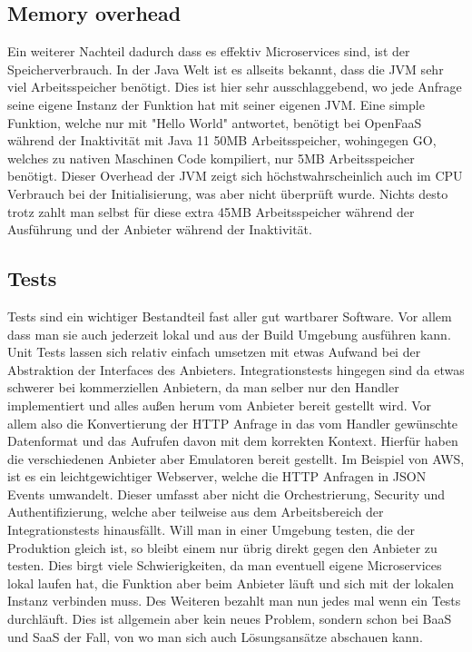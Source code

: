 \documentclass[12pt, a4paper]{article}
\begin{document}
\subsection{Memory overhead}
Ein weiterer Nachteil dadurch dass es effektiv Microservices sind, ist der Speicherverbrauch.
In der Java Welt ist es allseits bekannt, dass die \ac{JVM} sehr viel Arbeitsspeicher benötigt.
Dies ist hier sehr ausschlaggebend, wo jede Anfrage seine eigene Instanz der Funktion hat mit seiner eigenen \ac{JVM}.
Eine simple Funktion, welche nur mit "Hello World" antwortet, benötigt bei OpenFaaS während der Inaktivität mit Java 11 50MB Arbeitsspeicher, wohingegen GO, welches zu nativen Maschinen Code kompiliert, nur 5MB Arbeitsspeicher benötigt.
\newline
Dieser Overhead der JVM zeigt sich höchstwahrscheinlich auch im CPU Verbrauch bei der Initialisierung, was aber nicht überprüft wurde.
Nichts desto trotz zahlt man selbst für diese extra 45MB Arbeitsspeicher während der Ausführung und der Anbieter während der Inaktivität.

\subsection{Tests}
Tests sind ein wichtiger Bestandteil fast aller gut wartbarer Software.
Vor allem dass man sie auch jederzeit lokal und aus der Build Umgebung ausführen kann.
Unit Tests lassen sich relativ einfach umsetzen mit etwas Aufwand bei der Abstraktion der Interfaces des Anbieters.
\newline
Integrationstests hingegen sind da etwas schwerer bei kommerziellen Anbietern, da man selber nur den Handler implementiert und alles außen herum vom Anbieter bereit gestellt wird.
Vor allem also die Konvertierung der HTTP Anfrage in das vom Handler gewünschte Datenformat und das Aufrufen davon mit dem korrekten Kontext.
Hierfür haben die verschiedenen Anbieter aber Emulatoren bereit gestellt.
Im Beispiel von AWS, ist es ein leichtgewichtiger Webserver, welche die HTTP Anfragen in JSON Events umwandelt\cite{aws_lambda_rie}.
Dieser umfasst aber nicht die Orchestrierung, Security und Authentifizierung, welche aber teilweise aus dem Arbeitsbereich der Integrationstests hinausfällt.
\newline
Will man in einer Umgebung testen, die der Produktion gleich ist, so bleibt einem nur übrig direkt gegen den Anbieter zu testen.
Dies birgt viele Schwierigkeiten, da man eventuell eigene Microservices lokal laufen hat, die Funktion aber beim Anbieter läuft und sich mit der lokalen Instanz verbinden muss.
Des Weiteren bezahlt man nun jedes mal wenn ein Tests durchläuft.
\newline
Dies ist allgemein aber kein neues Problem, sondern schon bei \ac{BaaS} und \ac{SaaS} der Fall, von wo man sich auch Lösungsansätze abschauen kann.
\end{document}
